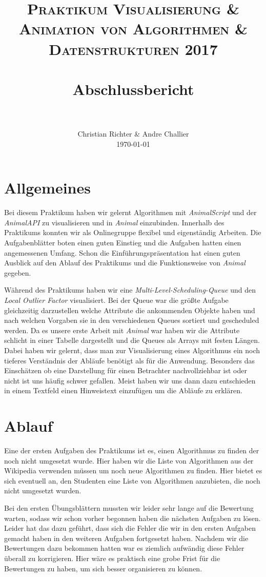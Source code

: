 \documentclass[paper=a4, fontsize=12pt,titlepage=false]{scrartcl}
\title{
		\usefont{OT1}{bch}{b}{n}
		\normalfont \normalsize \textsc{Praktikum Visualisierung \& Animation von Algorithmen \& Datenstrukturen 2017} \\ [25pt]
		\horrule{0.5pt} \\[0.4cm]
		\huge Abschlussbericht \\
		\horrule{2pt} \\[0.5cm]
}
\author{
		\normalfont 								\normalsize
        Christian Richter \& Andre Challier\\[-3pt]		\normalsize
        \today
}
\date{}
\begin{document}
\maketitle
\section{Allgemeines}
Bei diesem Praktikum haben wir gelernt Algorithmen mit \emph{AnimalScript} und der \emph{AnimalAPI} zu visualisieren und in \emph{Animal} einzubinden. Innerhalb des Praktikums konnten wir als Onlinegruppe flexibel und eigenständig Arbeiten. Die Aufgabenblätter boten einen guten Einstieg und die Aufgaben hatten einen angemessenen Umfang. Schon die Einführungspräsentation hat einen guten Ausblick auf den Ablauf des Praktikums und die Funktionsweise von \emph{Animal} gegeben.

Während des Praktikums haben wir eine \emph{Multi-Level-Scheduling-Queue} und den \emph{Local Outlier Factor} visualisiert. Bei der Queue war die größte Aufgabe gleichzeitig darzustellen welche Attribute die ankommenden Objekte haben und nach welchen Vorgaben sie in den verschiedenen Queues sortiert und gescheduled werden. Da es unsere erste Arbeit mit \emph{Animal} war haben wir die Attribute schlicht in einer Tabelle dargestellt und die Queues als Arrays mit festen Längen. Dabei haben wir gelernt, dass man zur Visualisierung eines Algorithmus ein noch tieferes Verständnis der Abläufe benötigt als für die Anwendung. Besonders das Einschätzen ob eine Darstellung für einen Betrachter nachvollziehbar ist oder nicht ist uns häufig schwer gefallen. Meist haben wir uns dann dazu entschieden in einem Textfeld einen Hinweistext einzufügen um die Abläufe zu erklären.

\section{Ablauf}

Eine der ersten Aufgaben des Praktikums ist es, einen Algorithmus zu finden der noch nicht umgesetzt wurde. Hier haben wir die \glqq Liste von Algorithmen\grqq{}  aus der Wikipedia verwenden müssen um noch neue Algorithmen zu finden. Hier bietet es sich eventuell an, den Studenten eine Liste von Algorithmen anzubieten, die noch nicht umgesetzt wurden.

Bei den ersten Übungsblättern mussten wir leider sehr lange auf die Bewertung warten, sodass wir schon vorher begonnen haben die nächsten Aufgaben zu lösen. Leider hat das dazu geführt, dass sich die Fehler die wir in den ersten Aufgaben gemacht haben in den weiteren Aufgaben fortgesetzt haben. Nachdem wir die Bewertungen dazu bekommen hatten war es ziemlich aufwändig diese Fehler überall zu korrigieren. Hier wäre es praktisch eine grobe Frist für die Bewertungen zu haben, um sich besser organisieren zu können.
\end{document}
